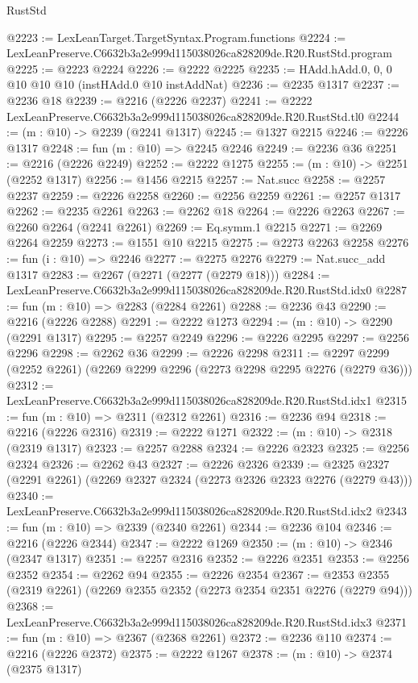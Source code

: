 \begin{lexlean}{RustStd}
\begin{coremodule}
@2223 := LexLeanTarget.TargetSyntax.Program.functions
@2224 := LexLeanPreserve.C6632b3a2e999d115038026ca828209de.R20.RustStd.program
@2225 := @2223 @2224
@2226 := @2222 @2225
@2235 := HAdd.hAdd.{0, 0, 0} @10 @10 @10 (instHAdd.{0} @10 instAddNat)
@2236 := @2235 @1317
@2237 := @2236 @18
@2239 := @2216 (@2226 @2237)
@2241 := @2222 LexLeanPreserve.C6632b3a2e999d115038026ca828209de.R20.RustStd.tl0
@2244 := (m : @10) -> @2239 (@2241 @1317)
@2245 := @1327 @2215
@2246 := @2226 @1317
@2248 := fun (m : @10) => @2245 @2246
@2249 := @2236 @36
@2251 := @2216 (@2226 @2249)
@2252 := @2222 @1275
@2255 := (m : @10) -> @2251 (@2252 @1317)
@2256 := @1456 @2215
@2257 := Nat.succ
@2258 := @2257 @2237
@2259 := @2226 @2258
@2260 := @2256 @2259
@2261 := @2257 @1317
@2262 := @2235 @2261
@2263 := @2262 @18
@2264 := @2226 @2263
@2267 := @2260 @2264 (@2241 @2261)
@2269 := Eq.symm.{1} @2215
@2271 := @2269 @2264 @2259
@2273 := @1551 @10 @2215
@2275 := @2273 @2263 @2258
@2276 := fun (i : @10) => @2246
@2277 := @2275 @2276
@2279 := Nat.succ_add @1317
@2283 := @2267 (@2271 (@2277 (@2279 @18)))
@2284 := LexLeanPreserve.C6632b3a2e999d115038026ca828209de.R20.RustStd.idx0
@2287 := fun (m : @10) => @2283 (@2284 @2261)
@2288 := @2236 @43
@2290 := @2216 (@2226 @2288)
@2291 := @2222 @1273
@2294 := (m : @10) -> @2290 (@2291 @1317)
@2295 := @2257 @2249
@2296 := @2226 @2295
@2297 := @2256 @2296
@2298 := @2262 @36
@2299 := @2226 @2298
@2311 := @2297 @2299 (@2252 @2261) (@2269 @2299 @2296 (@2273 @2298 @2295 @2276 (@2279 @36)))
@2312 := LexLeanPreserve.C6632b3a2e999d115038026ca828209de.R20.RustStd.idx1
@2315 := fun (m : @10) => @2311 (@2312 @2261)
@2316 := @2236 @94
@2318 := @2216 (@2226 @2316)
@2319 := @2222 @1271
@2322 := (m : @10) -> @2318 (@2319 @1317)
@2323 := @2257 @2288
@2324 := @2226 @2323
@2325 := @2256 @2324
@2326 := @2262 @43
@2327 := @2226 @2326
@2339 := @2325 @2327 (@2291 @2261) (@2269 @2327 @2324 (@2273 @2326 @2323 @2276 (@2279 @43)))
@2340 := LexLeanPreserve.C6632b3a2e999d115038026ca828209de.R20.RustStd.idx2
@2343 := fun (m : @10) => @2339 (@2340 @2261)
@2344 := @2236 @104
@2346 := @2216 (@2226 @2344)
@2347 := @2222 @1269
@2350 := (m : @10) -> @2346 (@2347 @1317)
@2351 := @2257 @2316
@2352 := @2226 @2351
@2353 := @2256 @2352
@2354 := @2262 @94
@2355 := @2226 @2354
@2367 := @2353 @2355 (@2319 @2261) (@2269 @2355 @2352 (@2273 @2354 @2351 @2276 (@2279 @94)))
@2368 := LexLeanPreserve.C6632b3a2e999d115038026ca828209de.R20.RustStd.idx3
@2371 := fun (m : @10) => @2367 (@2368 @2261)
@2372 := @2236 @110
@2374 := @2216 (@2226 @2372)
@2375 := @2222 @1267
@2378 := (m : @10) -> @2374 (@2375 @1317)

\end{coremodule}
\end{lexlean}
